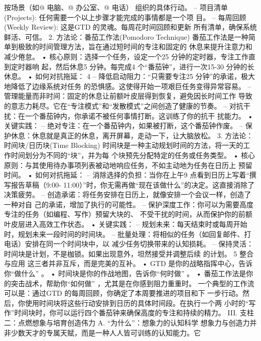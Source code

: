 \documentclass[a4paper,12pt]{article}
\begin{document}
\begin{multicols}{2}
    按场景（如@ 电脑、@ 办公室、@ 电话） 组织的具体行动。 --
    项目清单(Projects): 任何需要一个以上步骤才能完成的事情都是一个项
    目。 -- 每周回顾(Weekly Review): 这是GTD
    的灵魂。每周花时间回顾和更新 所有清单，确保系统鲜活、可信。 2.
    方法论：番茄工作法(Pomodoro Technique)
    番茄工作法是一种简单到极致的时间管理方法，旨在通过短时间的专注和固定的
    休息来提升注意力和减少倦怠。 • 核心原则：选择一个任务，设定一个25
    分钟的定时器，专注工作直到定时器响 起，然后休息5 分钟。每完成4
    个``番茄钟''，进行一次15-30 分钟的长休息。 • 如何对抗拖延： 4 --
    降低启动阻力：``只需要专注25
    分钟''的承诺，极大地降低了边缘系统对任务
    的恐惧感。这使得开始一项艰巨任务变得异常容易。 --
    管理能量而非时间：固定的休息让前额叶皮层得到恢复，避免因长时间工作
    导致的意志力耗尽。它在``专注模式''和``发散模式''之间创造了健康的节奏。
    --
    对抗干扰：在一个番茄钟内，你承诺不被任何事情打断。这训练了你的抗干
    扰能力。 • 关键实践： --
    绝对专注：在一个番茄钟内，如果被打断，这个番茄钟作废。 --
    保护休息：休息就是真正的休息，离开屏幕，走动一下，让大脑放松。 3.
    方法论：时间块/日历块(Time Blocking)
    时间块是一种主动规划时间的方法，将一天的工作时间划分为不同的``块''，并为每
    个块预先分配特定的任务或任务类型。 •
    核心原则：与其使用待办事项列表被动地响应任务，不如主动地为任务在日历上
    预留时间。 • 如何对抗拖延： -- 消除选择的负担：当你在上午9
    点看到日历上写着``撰写报告草稿（9:00-
    11:00）''时，你无需再做``现在该做什么''的决定。这直接消除了决策疲劳。
    --
    创造承诺：将任务安排在日历上，就像安排一个会议一样，创造了一种对自
    己的承诺，增加了执行的可能性。 --
    保护深度工作：你可以为需要高度专注的任务（如编程、写作）预留大块的、
    不受干扰的时间，从而保护你的前额叶皮层进入高效工作状态。 •
    关键实践： --
    规划未来：每天结束时或每周开始时，规划未来一段时间的时间块。 --
    批量处理：将相似的任务（如回复邮件、打电话）安排在同一个时间块中，以
    减少任务切换带来的认知损耗。 --
    保持灵活：时间块是计划，不是枷锁。如果出现意外，坦然接受并调整后续
    的计划。 5 整合与应用 这三者并非互斥，而是完美的互补。 • GTD
    是你的战略指挥中心，告诉你``做什么'' 。 •
    时间块是你的作战地图，告诉你``何时做'' 。 •
    番茄工作法是你的突击战术，帮助你``如何做''
    ，尤其是在你感到阻力重重时。 一个典型的工作流可以是：通过GTD
    的每周回顾，你确定了本周要推进的项目和下
    一步行动。然后，你使用时间块将这些行动安排到日历的具体时间段。在执行一个两
    小时的``写作''时间块时，你可以运行四个番茄钟来确保高度的专注和持续的精力。
    III. 支柱二：点燃想象与培育创造伟力 A. ``为什么''：想象力的认知科学
    想象力与创造力并非少数天才的专属天赋，而是一种人人皆可训练的认知能力。它

\end{multicols}
\end{document}
